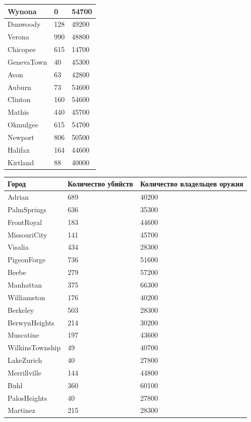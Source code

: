 \documentclass[titlepage]{article}
\begin{document}
\begin{table}[!ht]
\begin{tabular}{|l|l|l|}
        Wynona & 0 & 54700 \\ \hline
        Dunwoody & 128 & 49200 \\ \hline
        Verona & 990 & 48800 \\ \hline
        Chicopee & 615 & 14700 \\ \hline
        GenevaTown & 40 & 45300 \\ \hline
        Avon & 63 & 42800 \\ \hline
        Auburn & 73 & 54600 \\ \hline
        Clinton & 160 & 54600 \\ \hline
        Mathis & 440 & 45700 \\ \hline
        Okmulgee & 615 & 54700 \\ \hline
        Newport & 806 & 50500 \\ \hline
        Halifax & 164 & 44600 \\ \hline
        Kirtland & 88 & 40000 \\ \hline
    \end{tabular}
\end{table}
\begin{table}[!ht]
    \centering
    \begin{tabular}{|l|l|l|}
    \hline
        Город & Количество убийств & Количество владельцев оружия \\ \hline
        Adrian & 689 & 40200 \\ \hline
        PalmSprings & 636 & 35300 \\ \hline
        FrontRoyal & 183 & 44600 \\ \hline
        MissouriCity & 141 & 45700 \\ \hline
        Visalia & 434 & 28300 \\ \hline
        PigeonForge & 736 & 51600 \\ \hline
        Beebe & 279 & 57200 \\ \hline
        Manhattan & 375 & 66300 \\ \hline
        Williamston & 176 & 40200 \\ \hline
        Berkeley & 503 & 28300 \\ \hline
        BerwynHeights & 214 & 30200 \\ \hline
        Muscatine & 197 & 43600 \\ \hline
        WilkinsTownship & 49 & 40700 \\ \hline
        LakeZurich & 40 & 27800 \\ \hline
        Merrillville & 144 & 44800 \\ \hline
        Buhl & 360 & 60100 \\ \hline
        PalosHeights & 40 & 27800 \\ \hline
        Martinez & 215 & 28300 \\ \hline
    \end{tabular}
\end{table}

\mbox{}
\vfill
\end{document}
